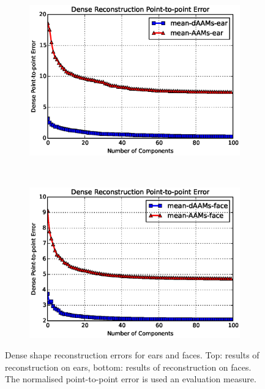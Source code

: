 \begin{figure}[!b]
    \centering
    \begin{subfigure}[b]{0.43\textwidth}
            \includegraphics[width=\textwidth]{Suplementory_Meterial/Model_Analysis/sr_ear}
    \end{subfigure}
    \\
    \begin{subfigure}[b]{0.43\textwidth}
            \includegraphics[width=\textwidth]{Suplementory_Meterial/Model_Analysis/sr_face}
    \end{subfigure}
    \caption{Dense shape reconstruction errors for ears and faces. Top: results of reconstruction on ears, bottom: results of reconstruction on faces. The normalised point-to-point error is used an evaluation measure.}
    \label{fig:rc_face}
\end{figure}


